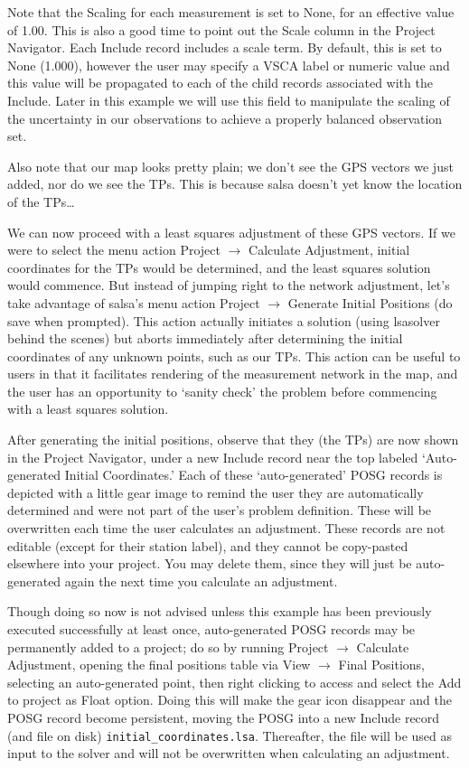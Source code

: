 Note that the Scaling for each measurement is set to None, for an effective value of 1.00. This is also a good time to point out the Scale column in the Project Navigator. Each Include record includes a scale term. By default, this is set to None (1.000), however the user may specify a VSCA label or numeric value and this value will be propagated to each of the child records associated with the Include. Later in this example we will use this field to manipulate the scaling of the uncertainty in our observations to achieve a properly balanced observation set.

Also note that our map looks pretty plain; we don't see the GPS vectors we just added, nor do we see the TPs.  This is because \textsf{salsa} doesn't yet know the location of the TPs\ldots

We can now proceed with a least squares adjustment of these GPS vectors.  If we were to select the menu action Project $\to$ Calculate Adjustment, initial coordinates for the TPs would be determined, and the least squares solution would commence.  But instead of jumping right to the network adjustment, let's take advantage of \textsf{salsa}'s menu action Project $\to$ Generate Initial Positions (do save when prompted).  This action actually initiates a solution (using \textsf{lsasolver} behind the scenes) but aborts immediately after determining the initial coordinates of any unknown points, such as our TPs.  This action can be useful to users in that it facilitates rendering of the measurement network in the map, and the user has an opportunity to `sanity check' the problem before commencing with a least squares solution.

After generating the initial positions, observe that they (the TPs) are now shown in the Project Navigator, under a new Include record near the top labeled `Auto-generated Initial Coordinates.'  Each of these `auto-generated' POSG records is depicted with a little gear image to remind the user they are automatically determined and were not part of the user's problem definition.  These will be overwritten each time the user calculates an adjustment.  These records are not editable (except for their station label), and they cannot be copy-pasted elsewhere into your project.  You may delete them, since they will just be auto-generated again the next time you calculate an adjustment.

Though doing so now is not advised unless this example has been previously executed successfully at least once, auto-generated POSG records may be permanently added to a project; do so by running Project $\to$ Calculate Adjustment, opening the final positions table via View $\to$ Final Positions, selecting an auto-generated point, then right clicking to access and select the Add to project as Float option.  Doing this will make the gear icon disappear and the POSG record become persistent, moving the POSG into a new Include record (and file on disk) \verb+initial_coordinates.lsa+.  Thereafter, the file will be used as input to the solver and will not be overwritten when calculating an adjustment.

